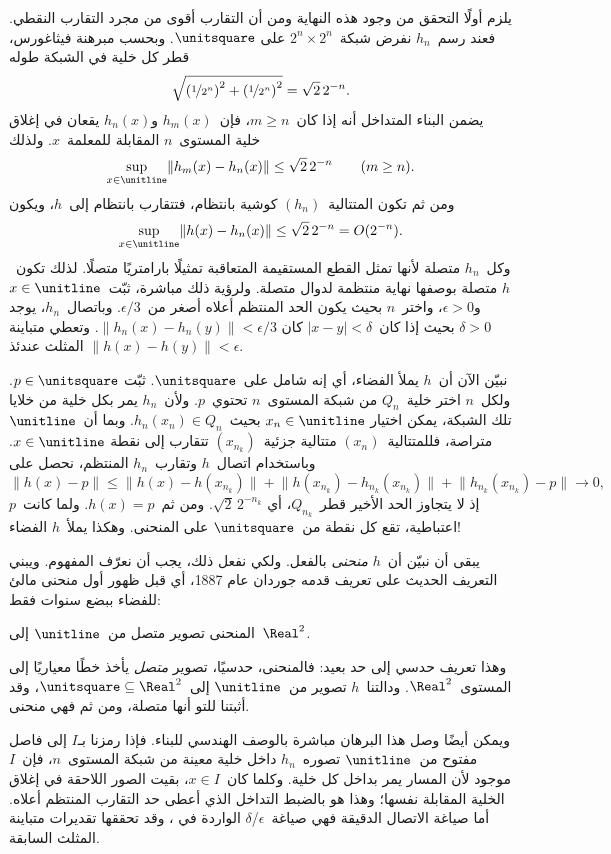 \documentclass[../../../include/open-logic-section]{subfiles}
\begin{document}
يلزم أولًا التحقق من وجود هذه النهاية ومن أن التقارب أقوى من مجرد
التقارب النقطي. فعند رسم~$h_n$ نفرض شبكة~$2^n \times 2^n$ على
$\unitsquare$. وبحسب مبرهنة فيثاغورس، قطر كل خلية في الشبكة طوله
\[
\sqrt{\left(\nicefrac{1}{2^{n}}\right)^2+\left(\nicefrac{1}{2^{n}}\right)^2}
= \sqrt{2}\,2^{-n}.
\]
يضمن البناء المتداخل أنه إذا كان~$m \geq n$، فإن~$h_m(x)$ و$h_n(x)$
يقعان في إغلاق خلية المستوى~$n$ المقابلة للمعلمة~$x$. ولذلك
\[
\sup_{x \in \unitline}\lVert h_m(x)-h_n(x)\rVert
\leq \sqrt{2}\,2^{-n}\qquad(m \geq n).
\]
ومن ثم تكون المتتالية~$(h_n)$ كوشية بانتظام، فتتقارب بانتظام إلى~$h$،
ويكون
\[
\sup_{x \in \unitline}\lVert h(x)-h_n(x)\rVert
\leq \sqrt{2}\,2^{-n} = O(2^{-n}).
\]
وكل~$h_n$ متصلة لأنها تمثل القطع المستقيمة المتعاقبة تمثيلًا بارامتريًا
متصلًا. لذلك تكون~$h$ متصلة بوصفها نهاية منتظمة لدوال متصلة. ولرؤية
ذلك مباشرة، ثبّت~$x \in \unitline$ و$\epsilon>0$، واختر~$n$ بحيث
يكون الحد المنتظم أعلاه أصغر من~$\epsilon/3$. وباتصال~$h_n$، يوجد
$\delta>0$ بحيث إذا كان~$|x-y|<\delta$ كان
$\lVert h_n(x)-h_n(y)\rVert<\epsilon/3$. وتعطي متباينة المثلث عندئذ
$\lVert h(x)-h(y)\rVert<\epsilon$.

نبيّن الآن أن~$h$ يملأ الفضاء، أي إنه شامل على~$\unitsquare$. ثبّت
$p \in \unitsquare$. ولكل~$n$ اختر خلية~$Q_n$ من شبكة المستوى~$n$
تحتوي~$p$. ولأن~$h_n$ يمر بكل خلية من خلايا تلك الشبكة، يمكن اختيار
$x_n \in \unitline$ بحيث~$h_n(x_n) \in Q_n$. وبما أن~$\unitline$
متراصة، فللمتتالية~$(x_n)$ متتالية جزئية~$(x_{n_k})$ تتقارب إلى نقطة
$x \in \unitline$. وباستخدام اتصال~$h$ وتقارب~$h_n$ المنتظم، نحصل
على
\[
\lVert h(x)-p\rVert
\leq \lVert h(x)-h(x_{n_k})\rVert
 + \lVert h(x_{n_k})-h_{n_k}(x_{n_k})\rVert
 + \lVert h_{n_k}(x_{n_k})-p\rVert \longrightarrow 0,
\]
إذ لا يتجاوز الحد الأخير قطر~$Q_{n_k}$، أي
$\sqrt{2}\,2^{-n_k}$. ومن ثم~$h(x)=p$. ولما كانت~$p$ اعتباطية، تقع
كل نقطة من~$\unitsquare$ على المنحنى. وهكذا يملأ~$h$ الفضاء!

يبقى أن نبيّن أن~$h$ \emph{منحنى} بالفعل. ولكي نفعل ذلك، يجب أن نعرّف
المفهوم. ويبني التعريف الحديث على تعريف قدمه جوردان عام 1887، أي قبل
ظهور أول منحنى مالئ للفضاء ببضع سنوات فقط:

\begin{defn}
المنحنى تصوير متصل من~$\unitline$ إلى~$\Real^2$.
\end{defn}

وهذا تعريف حدسي إلى حد بعيد: فالمنحنى، حدسيًا، تصوير \emph{متصل} يأخذ
خطًا معياريًا إلى المستوى~$\Real^2$. ودالتنا~$h$ تصوير من~$\unitline$
إلى~$\unitsquare \subseteq \Real^2$، وقد أثبتنا للتو أنها متصلة، ومن
ثم فهي منحنى.

ويمكن أيضًا وصل هذا البرهان مباشرة بالوصف الهندسي للبناء. فإذا رمزنا
بـ$I$ إلى فاصل مفتوح من~$\unitline$ تصوره~$h_n$ داخل خلية معينة من
شبكة المستوى~$n$، فإن~$I$ موجود لأن المسار يمر بداخل كل خلية. وكلما
كان~$x \in I$، بقيت الصور اللاحقة في إغلاق الخلية المقابلة نفسها؛
وهذا هو بالضبط التداخل الذي أعطى حد التقارب المنتظم أعلاه. أما صياغة
الاتصال الدقيقة فهي صياغة~$\epsilon$/$\delta$ الواردة في
، وقد تحققها تقديرات متباينة المثلث السابقة.
\end{document}
